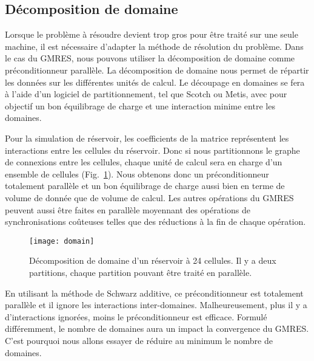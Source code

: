 \subsection{Décomposition de domaine}
Lorsque le problème à résoudre devient trop gros pour être traité sur une seule machine, il est nécessaire d'adapter la méthode de résolution du problème.
%
Dans le cas du GMRES, nous pouvons utiliser la décomposition de domaine comme préconditionneur parallèle.
%
La décomposition de domaine nous permet de répartir les données sur les différentes unités de calcul.
%
Le découpage en domaines se fera à l'aide d'un logiciel de partitionnement, tel que Scotch ou Metis, avec pour objectif un bon équilibrage de charge et une interaction minime entre les domaines.


Pour la simulation de réservoir, les coefficients de la matrice représentent les interactions entre les cellules du réservoir.
%
Donc si nous partitionnons le graphe de connexions entre les cellules, chaque unité de calcul sera en charge d'un ensemble de cellules (Fig.~\ref{fig:domain}).
%
Nous obtenons donc un préconditionneur totalement parallèle et un bon équilibrage de charge aussi bien en terme de volume de donnée que de volume de calcul.
%
Les autres opérations du GMRES peuvent aussi être faites en parallèle moyennant des opérations de synchronisations coûteuses telles que des réductions à la fin de chaque opération.

\begin{figure}
  \centering
  \texttt{[image: domain]}
  \caption{Décomposition de domaine d'un réservoir à 24 cellules. Il y a deux partitions, chaque partition pouvant être traité en parallèle.}
  \label{fig:domain}
\end{figure}

En utilisant la méthode de Schwarz additive, ce préconditionneur est totalement parallèle et il ignore les interactions inter-domaines.
%
Malheureusement, plus il y a d'interactions ignorées, moins le préconditionneur est efficace.
%
Formulé différemment, le nombre de domaines aura un impact la convergence du GMRES.
%
C'est pourquoi nous allons essayer de réduire au minimum le nombre de domaines.
